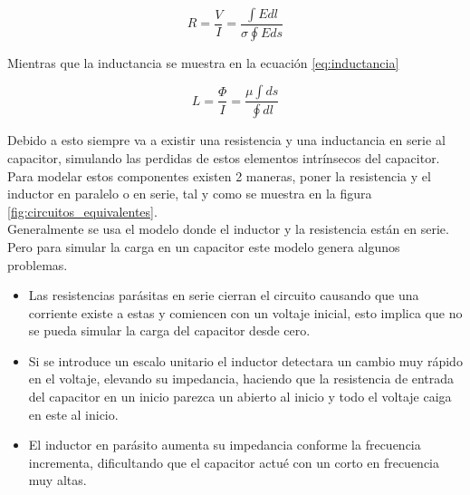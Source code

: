 \documentclass[journal]{IEEEtran}
\begin{document}
 \begin{equation}
 \label{eq:Resistencia}
 R=\frac{V}{I}=\frac{\int Edl}{\sigma \oint Eds}
 \end{equation}
 
 Mientras que la inductancia se muestra en la ecuación \ref{eq:inductancia} 
 
 \begin{equation}
 \label{eq:inductancia}
 L=\frac{\Phi }{I}=\frac{\mu \int ds}{ \oint dl}
 \end{equation}
 
 Debido a esto siempre va a existir una resistencia y una inductancia en serie al capacitor, simulando las perdidas de estos elementos intrínsecos del capacitor.\\ Para modelar estos componentes existen 2 maneras, poner la resistencia y el inductor en paralelo o en serie, tal y como se muestra en la figura \ref{fig:circuitos_equivalentes}.\\ Generalmente se usa el modelo donde el inductor y la resistencia están en serie. Pero para simular la carga en un capacitor este modelo genera algunos problemas.
 \begin{itemize}
 	\item Las resistencias parásitas en serie cierran el circuito causando que una corriente existe a estas y comiencen con un voltaje inicial, esto implica que no se pueda simular la carga del capacitor desde cero. 
	\item Si se introduce un escalo unitario el inductor detectara un cambio muy rápido en el voltaje, elevando su impedancia, haciendo que la resistencia de entrada del capacitor en un inicio parezca un abierto al inicio y todo el voltaje caiga en este al inicio.
 	\item El inductor en parásito aumenta su impedancia conforme la frecuencia incrementa, dificultando que el capacitor actué con un corto en frecuencia muy altas.
 \end{itemize}
 
\end{document}
